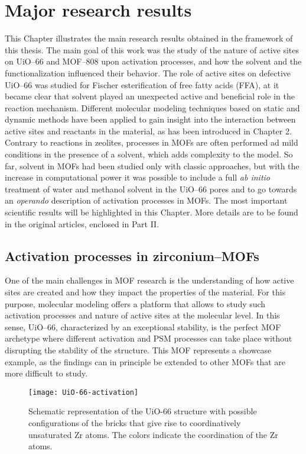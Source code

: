 \graphicspath{{figures/chapter3/}}
\renewcommand\evenpagerightmark{{\scshape\small Major research results}}
\renewcommand\oddpageleftmark{{\scshape\small Chapter 3}}

\hyphenation{}
\chapter[Major research results]%
{Major research results}
\label{ch3}
This Chapter illustrates the main research results obtained in the framework of this thesis. The main goal of this work was the study of the nature of active sites on UiO--66 and MOF--808 upon activation processes, and how the solvent and the functionalization influenced their behavior. The role of active sites on defective UiO--66 was studied for Fischer esterification of free fatty acids (FFA), at it became clear that solvent played an unexpected active and beneficial role in the reaction mechanism. Different molecular modeling techniques based on static and dynamic methods have been applied to gain insight into the interaction between active sites and reactants in the material, as has been introduced in Chapter 2. Contrary to reactions in zeolites, processes in MOFs are often performed ad mild conditions in the presence of a solvent, which adds complexity to the model. So far, solvent in MOFs had been studied only with classic approaches, but with the increase in computational power it was possible to include a full \textit{ab initio} treatment of water and methanol solvent in the UiO--66 pores and to go towards an \textit{operando} description of activation processes in MOFs. The most important scientific results will be highlighted in this Chapter. More details are to be found in the original articles, enclosed in Part II.

\section{Activation processes in zirconium--MOFs}
One of the main challenges in MOF research is the understanding of how active sites are created and how they impact the properties of the material. For this purpose, molecular modeling offers a platform that allows to study such activation processes and nature of active sites at the molecular level. In this sense, UiO--66, characterized by an exceptional stability, is the perfect MOF archetype where different activation and PSM processes can take place without disrupting the stability of the structure. This MOF represents a showcase example, as the findings can in principle be extended to other MOFs that are more difficult to study.
\begin{figure}[!htbp]
	\centering
	\texttt{[image: UiO-66-activation]}
	\caption{Schematic representation of the UiO-66 structure with possible configurations of the bricks that give rise to coordinatively unsaturated Zr atoms. The colors indicate the coordination of the Zr atoms.}
	\label{fig:UiO-66-activation}
\end{figure}
